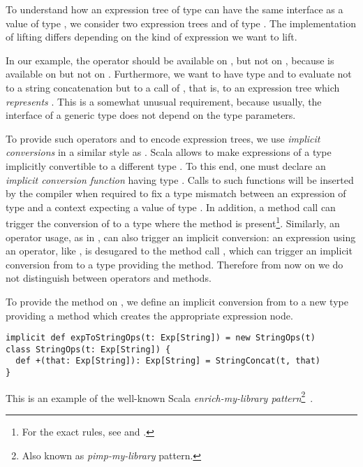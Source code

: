 To understand how an expression tree of type  can have the same interface as a value of type , we consider two expression trees  and  of type . The implementation of lifting differs depending on the kind of expression we want to lift.

In our example, the operator \code{+} should be available on , but not on , because \code{+} is available on  but not on .
Furthermore, we want  to have type  and to evaluate not to a string concatenation but to a call of , that is, to an expression tree which \emph{represents} . This is a somewhat unusual requirement, because usually, the interface of a generic type does not depend on the type parameters.

To provide such operators and to encode expression trees, we use \emph{implicit conversions} in a similar style as \citet{rompf2010lightweight}. Scala allows to make expressions of a type  implicitly convertible to a different type . To this end, one must declare an \emph{implicit conversion function} having type . Calls to such functions will be inserted by the compiler when required to fix a type mismatch between an expression of type  and a context expecting a value of type . In addition, a method call  can trigger the conversion of  to a type where the method  is present\footnote{For the exact rules, see \citet[Ch.~21]{Odersky11book} and \citet{ScalaRef}.}. Similarly, an operator usage, as in , can also trigger an implicit conversion: an expression using an operator, like , is desugared to the method call , which can trigger an implicit conversion from  to a type providing the \code{+} method. Therefore from now on we do not distinguish between operators and methods.

To provide the method \code{+} on , we define an implicit conversion from  to a new type providing a \code{+} method which creates the appropriate expression node.
\begin{lstlisting}
implicit def expToStringOps(t: Exp[String]) = new StringOps(t)
class StringOps(t: Exp[String]) {
  def +(that: Exp[String]): Exp[String] = StringConcat(t, that)
}
\end{lstlisting}
This is an example of the well-known Scala \emph{enrich-my-library pattern}\footnote{Also known as \emph{pimp-my-library} pattern.}~\citep{OderskyPimpLib}.

